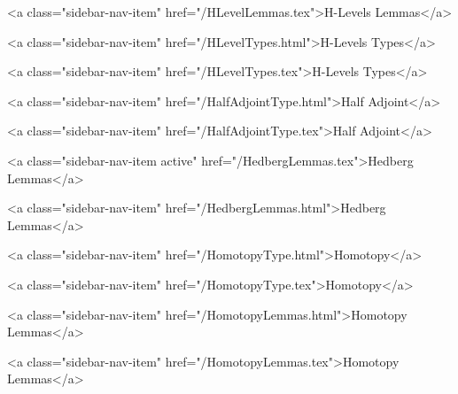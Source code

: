       
        
          <a class="sidebar-nav-item" href="/HLevelLemmas.tex">H-Levels Lemmas</a>
        
      
    
      
        
          <a class="sidebar-nav-item" href="/HLevelTypes.html">H-Levels Types</a>
        
      
    
      
        
          <a class="sidebar-nav-item" href="/HLevelTypes.tex">H-Levels Types</a>
        
      
    
      
        
          <a class="sidebar-nav-item" href="/HalfAdjointType.html">Half Adjoint</a>
        
      
    
      
        
          <a class="sidebar-nav-item" href="/HalfAdjointType.tex">Half Adjoint</a>
        
      
    
      
        
          <a class="sidebar-nav-item active" href="/HedbergLemmas.tex">Hedberg Lemmas</a>
        
      
    
      
        
          <a class="sidebar-nav-item" href="/HedbergLemmas.html">Hedberg Lemmas</a>
        
      
    
      
        
          <a class="sidebar-nav-item" href="/HomotopyType.html">Homotopy</a>
        
      
    
      
        
          <a class="sidebar-nav-item" href="/HomotopyType.tex">Homotopy</a>
        
      
    
      
        
          <a class="sidebar-nav-item" href="/HomotopyLemmas.html">Homotopy Lemmas</a>
        
      
    
      
        
          <a class="sidebar-nav-item" href="/HomotopyLemmas.tex">Homotopy Lemmas</a>
        
      
    
